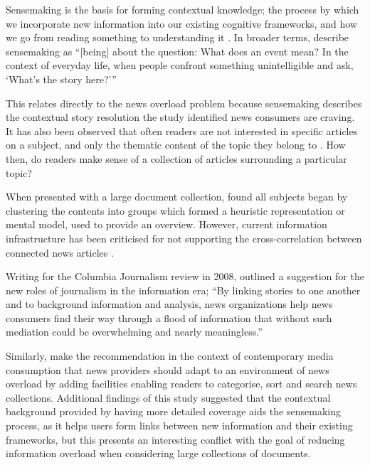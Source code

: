 Sensemaking is the basis for forming contextual knowledge; the process by which we incorporate new information into our existing cognitive frameworks, and how we go from reading something to understanding it \citep{FromInformationToKnowing}. In broader terms, \citeauthor{OrganizingAndTheProcessOfSensemaking} describe sensemaking as ``[being] about the question: What does an event mean? In the context of everyday life, when people confront something unintelligible and ask, `What's the story here?'{}'' \citep[p.85]{OrganizingAndTheProcessOfSensemaking} 

This relates directly to the news overload problem because sensemaking describes the contextual story resolution the \citet{anewmodelfornews} study identified news consumers are craving. It has also been observed that often readers are not interested in specific articles on a subject, and only the thematic content of the topic they belong to \citep{AnalysingUserAccessToAnOnlineNewspaper}. How then, do readers make sense of a collection of articles surrounding a particular topic?

When presented with a large document collection, \citet{BeingLiteratreWithLargeDocumentCollections} found all subjects began by clustering the contents into groups which formed a heuristic representation or mental model, used to provide an overview. However, current information infrastructure has been criticised for not supporting the cross-correlation between connected news articles \citep{GalaxyOfNews}.

Writing for the Columbia Journalism review in 2008, \citeauthor{overloadjournalismsbattle} outlined a suggestion for the new roles of journalism in the information era; ``By linking stories to one another and to background information and analysis, news organizations help news consumers find their way through a flood of information that without such mediation could be overwhelming and nearly meaningless.''\citep[p.10]{overloadjournalismsbattle} 

Similarly, \citet{FromInformationToKnowing} make the recommendation in the context of contemporary media consumption that news providers should adapt to an environment of news overload by adding facilities enabling readers to categorise, sort and search news collections. Additional findings of this study suggested that the contextual background provided by having more detailed coverage aids the sensemaking process, as it helps users form links between new information and their existing frameworks, but this presents an interesting conflict with the goal of reducing information overload when considering large collections of documents.

